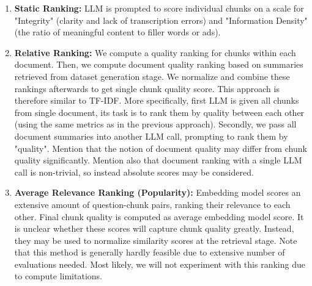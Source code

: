 \documentclass[11pt]{article}
\begin{document}
\begin{enumerate}
\item \textbf{Static Ranking:} LLM is prompted to score individual chunks on a scale for "Integrity" (clarity and lack of transcription errors) and "Information Density" (the ratio of meaningful content to filler words or ads). 

\item \textbf{Relative Ranking:} 
We compute a quality ranking for chunks within each document. Then, we compute document quality ranking based on summaries retrieved from dataset generation stage. We normalize and combine these rankings afterwards to get single chunk quality score. This approach is therefore similar to TF-IDF.
More specifically, first LLM is given all chunks from single document, its task is to rank them by quality between each other (using the same metrics as in the previous approach). Secondly, we pass all document summaries into another LLM call, prompting to rank them by "quality". Mention that the notion of document quality may differ from chunk quality significantly. Mention also that document ranking with a single LLM call is non-trivial, so instead absolute scores may be considered.


\item \textbf{Average Relevance Ranking (Popularity):}
Embedding model scores an extensive amount of question-chunk pairs, ranking their relevance to each other. Final chunk quality is computed as average embedding model score. It is unclear whether these scores will capture chunk quality greatly. Instead, they may be used to normalize similarity scores at the retrieval stage. Note that this method is generally hardly feasible due to extensive number of evaluations needed. Most likely, we will not experiment with this ranking due to compute limitations. 

\end{enumerate}
\end{document}
